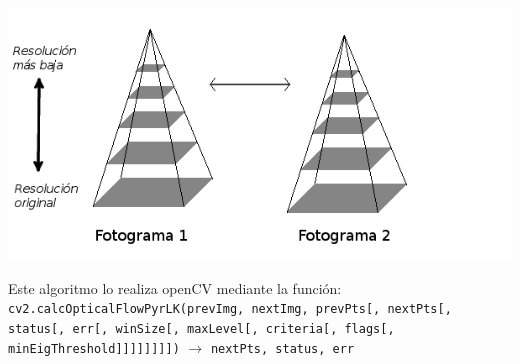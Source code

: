 \documentclass[a4paper,openright, 12pt]{book}
\begin{document}
\includegraphics[scale=0.6]{pyramid}



Este algoritmo lo realiza openCV mediante la función: \newline
\lstinline|cv2.calcOpticalFlowPyrLK(prevImg, nextImg, prevPts[, nextPts[, status[, err[, winSize[, maxLevel[, criteria[, flags[, minEigThreshold]]]]]]]])|
$\rightarrow$  \lstinline|nextPts, status, err|
\newline
\end{document}
